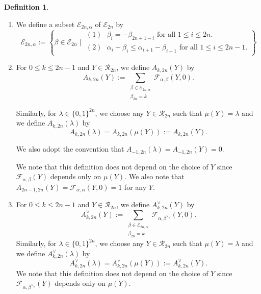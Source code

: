 \documentclass[11pt,oneside]{amsart}
\theoremstyle{plain}
\theoremstyle{definition}
\newtheorem{definition}[theorem]{Definition}
\theoremstyle{remark}
\newcommand{\tx}[1]{\text{#1}}
\newcommand{\CE}{{\mathcal E}}
\newcommand{\CF}{{\mathcal F}}
\newcommand{\CR}{{\mathcal R}}
\numberwithin{equation}{section}
\begin{document}
	\begin{definition}\label{definition3.5}
		\begin{enumerate}
			\item We define a subset $\CE_{2n,\alpha}$ of $\CE_{2n}$ by
			\begin{equation*}
				\CE_{2n,\alpha}:=\left\lbrace \beta \in \CE_{2n} \mid \begin{array}{lll} (1)\tx{ } \beta_i=-\beta_{2n+1-i} \text{ for all }1 \leq i \leq 2n.\\
					(2)\tx{ } \alpha_i-\beta_i \leq \alpha_{i+1}-\beta_{i+1} \text{ for all } 1\leq i \leq 2n-1. \end{array}\right\rbrace
			\end{equation*}
			\item For $0 \leq k \leq 2n-1$ and $Y \in \CR_{2n}$, we define $A_{k,2n}(Y)$ by
			\begin{equation*}
				A_{k,2n}(Y):=\sum_{\substack{\beta \in \CE_{2n,\alpha}\\\beta_{2n}=k}}\CF_{\alpha,\beta}(Y,0).
			\end{equation*}
			
			Similarly, for $\lambda \in \lbrace 0,1 \rbrace^{2n}$, we choose any $Y \in \CR_{2n}$ such that $\mu(Y)=\lambda$ and we define $A_{k,2n}(\lambda)$ by
			\begin{equation*}
				A_{k,2n}(\lambda)=A_{k,2n}(\mu(Y)):=A_{k,2n}(Y).
			\end{equation*}
			
			We also adopt the convention that $A_{-1,2n}(\lambda)=A_{-1,2n}(Y)=0$.
			
			We note that this definition does not depend on the choice of $Y$ since $\CF_{\alpha,\beta}(Y)$ depends only on $\mu(Y)$. We also note that $A_{2n-1,2n}(Y)=\CF_{\alpha,\alpha}(Y,0)=1$ for any $Y$.
			
			\item For $0 \leq k \leq 2n-1$ and $Y \in \CR_{2n}$, we define $A_{k,2n}^{\vee}(Y)$ by
			\begin{equation*}
				A_{k,2n}^{\vee}(Y):=\sum_{\substack{\beta \in \CE_{2n,\alpha}\\\beta_{2n}=k}}\CF_{\alpha,\beta^{\vee_n}}(Y,0).
			\end{equation*}
			Similarly, for $\lambda \in \lbrace 0,1 \rbrace^{2n}$, we choose any $Y \in \CR_{2n}$ such that $\mu(Y)=\lambda$ and we define $A_{k,2n}^{\vee}(\lambda)$ by
			\begin{equation*}
				A_{k,2n}^{\vee}(\lambda)=A_{k,2n}^{\vee}(\mu(Y)):=A_{k,2n}^{\vee}(Y).
			\end{equation*}
			We note that this definition does not depend on the choice of $Y$ since $\CF_{\alpha,\beta^{\vee_n}}(Y)$ depends only on $\mu(Y)$.
		\end{enumerate}
	\end{definition}
	
\end{document}
